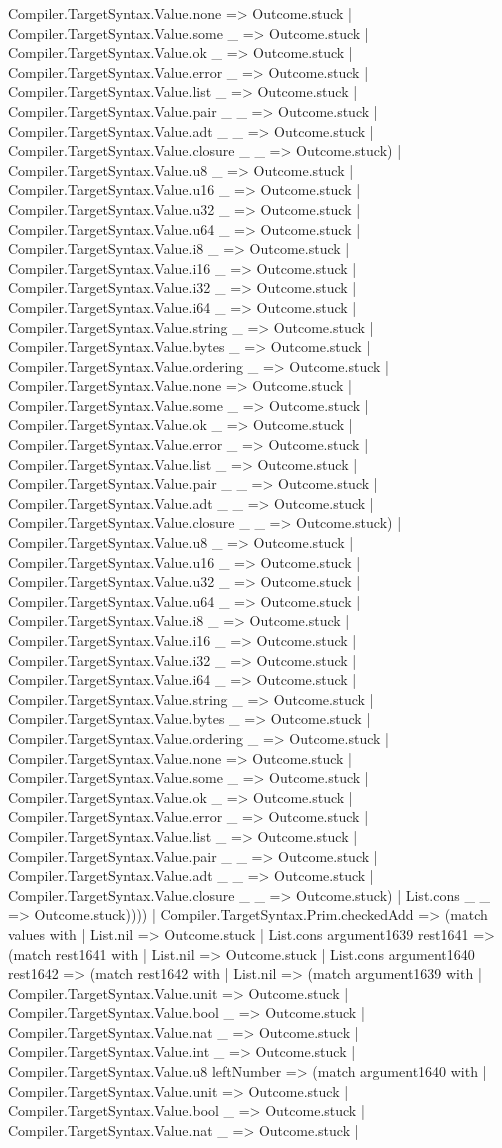 \documentclass[11pt]{article}
\begin{document}
Compiler.TargetSyntax.Value.none => Outcome.stuck | Compiler.TargetSyntax.Value.some \_ => Outcome.stuck | Compiler.TargetSyntax.Value.ok \_ => Outcome.stuck | Compiler.TargetSyntax.Value.error \_ => Outcome.stuck | Compiler.TargetSyntax.Value.list \_ => Outcome.stuck | Compiler.TargetSyntax.Value.pair \_ \_ => Outcome.stuck | Compiler.TargetSyntax.Value.adt \_ \_ => Outcome.stuck | Compiler.TargetSyntax.Value.closure \_ \_ => Outcome.stuck) | Compiler.TargetSyntax.Value.u8 \_ => Outcome.stuck | Compiler.TargetSyntax.Value.u16 \_ => Outcome.stuck | Compiler.TargetSyntax.Value.u32 \_ => Outcome.stuck | Compiler.TargetSyntax.Value.u64 \_ => Outcome.stuck | Compiler.TargetSyntax.Value.i8 \_ => Outcome.stuck | Compiler.TargetSyntax.Value.i16 \_ => Outcome.stuck | Compiler.TargetSyntax.Value.i32 \_ => Outcome.stuck | Compiler.TargetSyntax.Value.i64 \_ => Outcome.stuck | Compiler.TargetSyntax.Value.string \_ => Outcome.stuck | Compiler.TargetSyntax.Value.bytes \_ => Outcome.stuck | Compiler.TargetSyntax.Value.ordering \_ => Outcome.stuck | Compiler.TargetSyntax.Value.none => Outcome.stuck | Compiler.TargetSyntax.Value.some \_ => Outcome.stuck | Compiler.TargetSyntax.Value.ok \_ => Outcome.stuck | Compiler.TargetSyntax.Value.error \_ => Outcome.stuck | Compiler.TargetSyntax.Value.list \_ => Outcome.stuck | Compiler.TargetSyntax.Value.pair \_ \_ => Outcome.stuck | Compiler.TargetSyntax.Value.adt \_ \_ => Outcome.stuck | Compiler.TargetSyntax.Value.closure \_ \_ => Outcome.stuck) | Compiler.TargetSyntax.Value.u8 \_ => Outcome.stuck | Compiler.TargetSyntax.Value.u16 \_ => Outcome.stuck | Compiler.TargetSyntax.Value.u32 \_ => Outcome.stuck | Compiler.TargetSyntax.Value.u64 \_ => Outcome.stuck | Compiler.TargetSyntax.Value.i8 \_ => Outcome.stuck | Compiler.TargetSyntax.Value.i16 \_ => Outcome.stuck | Compiler.TargetSyntax.Value.i32 \_ => Outcome.stuck | Compiler.TargetSyntax.Value.i64 \_ => Outcome.stuck | Compiler.TargetSyntax.Value.string \_ => Outcome.stuck | Compiler.TargetSyntax.Value.bytes \_ => Outcome.stuck | Compiler.TargetSyntax.Value.ordering \_ => Outcome.stuck | Compiler.TargetSyntax.Value.none => Outcome.stuck | Compiler.TargetSyntax.Value.some \_ => Outcome.stuck | Compiler.TargetSyntax.Value.ok \_ => Outcome.stuck | Compiler.TargetSyntax.Value.error \_ => Outcome.stuck | Compiler.TargetSyntax.Value.list \_ => Outcome.stuck | Compiler.TargetSyntax.Value.pair \_ \_ => Outcome.stuck | Compiler.TargetSyntax.Value.adt \_ \_ => Outcome.stuck | Compiler.TargetSyntax.Value.closure \_ \_ => Outcome.stuck) | List.cons \_ \_ => Outcome.stuck)))) | Compiler.TargetSyntax.Prim.checkedAdd => (match values with | List.nil => Outcome.stuck | List.cons argument1639 rest1641 => (match rest1641 with | List.nil => Outcome.stuck | List.cons argument1640 rest1642 => (match rest1642 with | List.nil => (match argument1639 with | Compiler.TargetSyntax.Value.unit => Outcome.stuck | Compiler.TargetSyntax.Value.bool \_ => Outcome.stuck | Compiler.TargetSyntax.Value.nat \_ => Outcome.stuck | Compiler.TargetSyntax.Value.int \_ => Outcome.stuck | Compiler.TargetSyntax.Value.u8 leftNumber => (match argument1640 with | Compiler.TargetSyntax.Value.unit => Outcome.stuck | Compiler.TargetSyntax.Value.bool \_ => Outcome.stuck | Compiler.TargetSyntax.Value.nat \_ => Outcome.stuck | 
\end{document}
